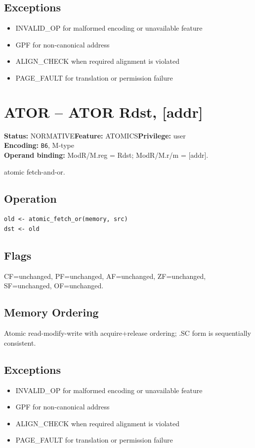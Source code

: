 \documentclass[10pt]{article}
\begin{document}
\subsection*{Exceptions}
\begin{itemize}
\item INVALID\_OP for malformed encoding or unavailable feature
\item GPF for non-canonical address
\item ALIGN\_CHECK when required alignment is violated
\item PAGE\_FAULT for translation or permission failure
\end{itemize}
\clearpage

\section{ATOR -- ATOR Rdst, [addr]}
\textbf{Status:} NORMATIVE\quad \textbf{Feature:} ATOMICS\quad \textbf{Privilege:} user\\
\textbf{Encoding:} \texttt{B6}, M-type\\
\textbf{Operand binding:} ModR/M.reg = Rdst; ModR/M.r/m = [addr].

atomic fetch-and-or.

\subsection*{Operation}
\begin{lstlisting}
old <- atomic_fetch_or(memory, src)
dst <- old
\end{lstlisting}
\subsection*{Flags}
CF=unchanged, PF=unchanged, AF=unchanged, ZF=unchanged, SF=unchanged, OF=unchanged.
\subsection*{Memory Ordering}
Atomic read-modify-write with acquire+release ordering; .SC form is sequentially consistent.
\subsection*{Exceptions}
\begin{itemize}
\item INVALID\_OP for malformed encoding or unavailable feature
\item GPF for non-canonical address
\item ALIGN\_CHECK when required alignment is violated
\item PAGE\_FAULT for translation or permission failure
\end{itemize}
\clearpage
\end{document}

